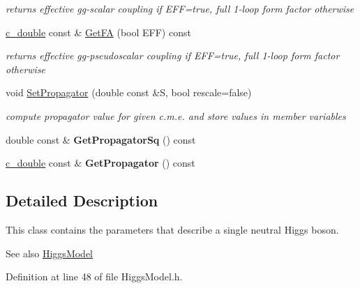 \begin{DoxyCompactItemize}
\begin{DoxyCompactList}\small\item\em returns effective gg-\/scalar coupling if E\+F\+F=true, full 1-\/loop form factor otherwise \end{DoxyCompactList}\item 
\hypertarget{classHiggsBoson_a8af3de930fb155b566956ab7c0457e29}{}\hyperlink{Global_8h_af390c6bd8192faf6a1e2d875a1d10ca0}{c\+\_\+double} const \& \hyperlink{classHiggsBoson_a8af3de930fb155b566956ab7c0457e29}{Get\+F\+A} (bool E\+F\+F) const \label{classHiggsBoson_a8af3de930fb155b566956ab7c0457e29}

\begin{DoxyCompactList}\small\item\em returns effective gg-\/pseudoscalar coupling if E\+F\+F=true, full 1-\/loop form factor otherwise \end{DoxyCompactList}\item 
void \hyperlink{classHiggsBoson_afebe4ad11ea2cbc2ec0ed1b94759c293}{Set\+Propagator} (double const \&S, bool rescale=false)
\begin{DoxyCompactList}\small\item\em compute propagator value for given c.\+m.\+e. and store values in member variables \end{DoxyCompactList}\item 
\hypertarget{classHiggsBoson_a3b836f00cee69f41cd04dd61e86bc4ab}{}double const \& {\bfseries Get\+Propagator\+Sq} () const \label{classHiggsBoson_a3b836f00cee69f41cd04dd61e86bc4ab}

\item 
\hypertarget{classHiggsBoson_abc21bb217a9a176025516e429a6c25ee}{}\hyperlink{Global_8h_af390c6bd8192faf6a1e2d875a1d10ca0}{c\+\_\+double} const \& {\bfseries Get\+Propagator} () const \label{classHiggsBoson_abc21bb217a9a176025516e429a6c25ee}

\end{DoxyCompactItemize}


\subsection{Detailed Description}
This class contains the parameters that describe a single neutral Higgs boson. \begin{DoxySeeAlso}{See also}
\hyperlink{classHiggsModel}{Higgs\+Model} 
\end{DoxySeeAlso}


Definition at line 48 of file Higgs\+Model.\+h.



